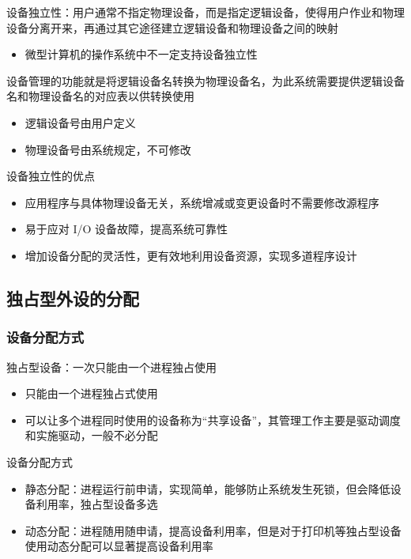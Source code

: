 \documentclass[cs4size,a4paper,10pt]{ctexart}
\begin{document}
	设备独立性：用户通常不指定物理设备，而是指定逻辑设备，使得用户作业和物理设备分离开来，再通过其它途径建立逻辑设备和物理设备之间的映射
	\begin{itemize}
		\item 微型计算机的操作系统中不一定支持设备独立性
	\end{itemize}

	设备管理的功能就是将逻辑设备名转换为物理设备名，为此系统需要提供逻辑设备名和物理设备名的对应表以供转换使用
	\begin{itemize}
		\item 逻辑设备号由用户定义
		\item 物理设备号由系统规定，不可修改
	\end{itemize}

	设备独立性的优点
	\begin{itemize}
		\item 应用程序与具体物理设备无关，系统增减或变更设备时不需要修改源程序
		\item 易于应对 I/O 设备故障，提高系统可靠性
		\item 增加设备分配的灵活性，更有效地利用设备资源，实现多道程序设计
	\end{itemize}

	\subsection{独占型外设的分配}
	\subsubsection{设备分配方式}
	独占型设备：一次只能由一个进程独占使用
	\begin{itemize}
		\item 只能由一个进程独占式使用
		\item 可以让多个进程同时使用的设备称为“共享设备”，其管理工作主要是驱动调度和实施驱动，一般不必分配
	\end{itemize}

	设备分配方式
	\begin{itemize}
		\item 静态分配：进程运行前申请，实现简单，能够防止系统发生死锁，但会降低设备利用率，独占型设备多选
		\item 动态分配：进程随用随申请，提高设备利用率，但是对于打印机等独占型设备使用动态分配可以显著提高设备利用率
	\end{itemize}
\end{document}
